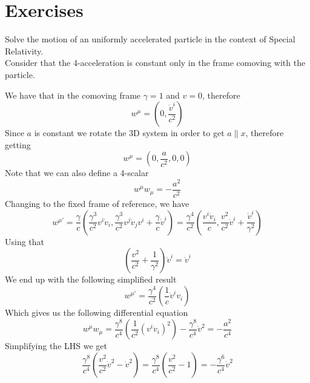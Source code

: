 \documentclass[../admech.tex]{subfiles}
\begin{document}
\section{Exercises}
\begin{exe}
	Solve the motion of an uniformly accelerated particle in the context of Special Relativity.\\
	Consider that the 4-acceleration is constant only in the frame comoving with the particle.\\
\end{exe}
\begin{sol}
	We have that in the comoving frame $\gamma=1$ and $v=0$, therefore
	\begin{equation*}
		w^\mu=\left( 0,\frac{\dot{v}^i}{c^2} \right)
	\end{equation*}
	Since $a$ is constant we rotate the 3D system in order to get $a\parallel x$, therefore getting
	\begin{equation*}
		w^\mu=\left( 0,\frac{a}{c^2},0,0 \right)
	\end{equation*}
	Note that we can also define a 4-scalar
	\begin{equation*}
		w^\mu w_\mu=-\frac{a^2}{c^2}
	\end{equation*}
	Changing to the fixed frame of reference, we have
	\begin{equation*}
		w^{\mu'}=\frac{\gamma}{c}\left( \frac{\gamma^3}{c^2}v^{i}\dot{v}_i,\frac{\gamma^3}{c^2}v^{j}\dot{v}_jv^{i}+\frac{\gamma}{c}\dot{v}^{i} \right)=\frac{\gamma^4}{c^2}\left( \frac{v^{i}\dot{v}_i}{c},\frac{v^{2}}{c^2}\dot{v}^{i}+\frac{\dot{v}^{i}}{\gamma^2} \right)
	\end{equation*}
	Using that
	\begin{equation*}
		\left( \frac{v^2}{c^2}+\frac{1}{\gamma^2} \right)\dot{v}^i=\dot{v}^i
	\end{equation*}
	We end up with the following simplified result
	\begin{equation*}
		w^{\mu'}=\frac{\gamma^4}{c^2}\left( \frac{1}{c}\dot{v}^{i}v_i \right)
	\end{equation*}
	Which gives us the following differential equation
	\begin{equation*}
		w^\mu w_\mu=\frac{\gamma^8}{c^4}\left( \frac{1}{c^2}(v^i\dot{v}_i)^2 \right)-\frac{\gamma^8}{c^4}\dot{v}^2=-\frac{a^2}{c^4}
	\end{equation*}
	Simplifying the LHS we get
	\begin{equation*}
		\frac{\gamma^8}{c^4}\left( \frac{v^2}{c^2}\dot{v}^2-\dot{v}^2 \right)=\frac{\gamma^8}{c^4}\left( \frac{v^2}{c^2}-1 \right)=-\frac{\gamma^6}{c^4}\dot{v}^2

\end{equation*}
\end{sol}
\end{document}
